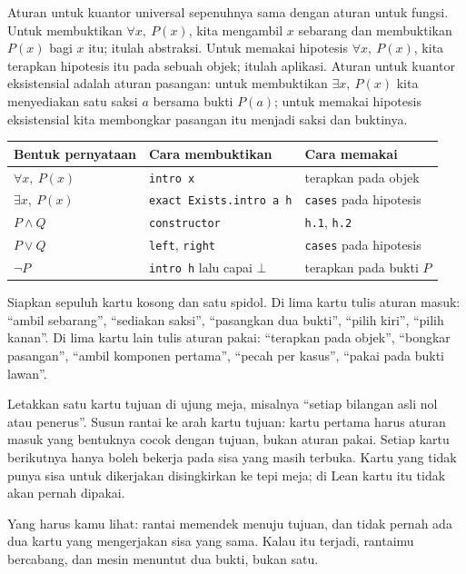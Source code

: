 
Aturan untuk kuantor universal sepenuhnya sama dengan aturan untuk fungsi. Untuk membuktikan
$\forall x,\ P(x)$, kita mengambil $x$ sebarang dan membuktikan $P(x)$ bagi $x$ itu; itulah
abstraksi. Untuk memakai hipotesis $\forall x,\ P(x)$, kita terapkan hipotesis itu pada sebuah
objek; itulah aplikasi. Aturan untuk kuantor eksistensial adalah aturan pasangan: untuk
membuktikan $\exists x,\ P(x)$ kita menyediakan satu saksi $a$ bersama bukti $P(a)$; untuk memakai
hipotesis eksistensial kita membongkar pasangan itu menjadi saksi dan buktinya.

\begin{center}
\begin{tabular}{lll}
\hline
Bentuk pernyataan & Cara membuktikan & Cara memakai \\
\hline
$\forall x,\ P(x)$      & \texttt{intro x}              & terapkan pada objek \\
$\exists x,\ P(x)$      & \texttt{exact Exists.intro a h} & \texttt{cases} pada hipotesis \\
$P\wedge Q$             & \texttt{constructor}          & \texttt{h.1}, \texttt{h.2} \\
$P\vee Q$               & \texttt{left}, \texttt{right} & \texttt{cases} pada hipotesis \\
$\neg P$                & \texttt{intro h} lalu capai $\bot$ & terapkan pada bukti $P$ \\
\hline
\end{tabular}
\end{center}

\begin{tangan}
Siapkan sepuluh kartu kosong dan satu spidol. Di lima kartu tulis aturan masuk: ``ambil sebarang'',
``sediakan saksi'', ``pasangkan dua bukti'', ``pilih kiri'', ``pilih kanan''. Di lima kartu lain
tulis aturan pakai: ``terapkan pada objek'', ``bongkar pasangan'', ``ambil komponen pertama'',
``pecah per kasus'', ``pakai pada bukti lawan''.

Letakkan satu kartu tujuan di ujung meja, misalnya ``setiap bilangan asli nol atau penerus''. Susun
rantai ke arah kartu tujuan: kartu pertama harus aturan masuk yang bentuknya cocok dengan tujuan,
bukan aturan pakai. Setiap kartu berikutnya hanya boleh bekerja pada sisa yang masih terbuka. Kartu
yang tidak punya sisa untuk dikerjakan disingkirkan ke tepi meja; di Lean kartu itu tidak akan
pernah dipakai.

Yang harus kamu lihat: rantai memendek menuju tujuan, dan tidak pernah ada dua kartu yang mengerjakan
sisa yang sama. Kalau itu terjadi, rantaimu bercabang, dan mesin menuntut dua bukti, bukan satu.
\end{tangan}

